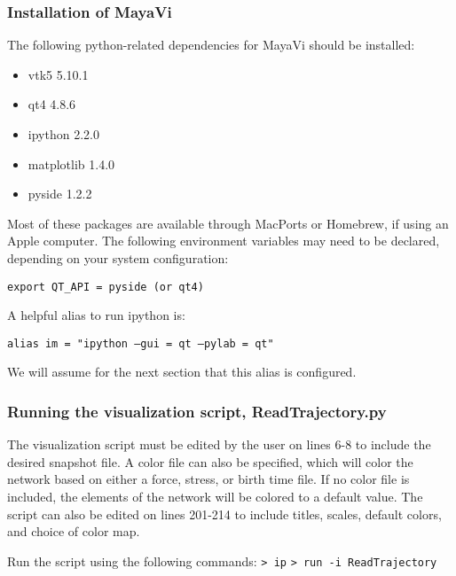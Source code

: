 \documentclass[11pt, oneside]{article}   	%
\begin{document}
\subsubsection{Installation of MayaVi}

The following python-related dependencies for MayaVi should be installed:
\begin{itemize}
\item vtk5 5.10.1
\item qt4 4.8.6
\item ipython 2.2.0
\item matplotlib 1.4.0
\item pyside 1.2.2
\end{itemize}

\noindent Most of these packages are available through MacPorts or Homebrew, if using an Apple computer. The following environment variables
may need to be declared, depending on your system configuration:\newline

\texttt{export QT\_API = pyside (or qt4)}\newline

\noindent A helpful alias to run ipython is:\newline

\texttt{alias im = "ipython --gui = qt --pylab = qt"}\newline

\noindent We will assume for the next section that this alias is configured.


\subsubsection{Running the visualization script, ReadTrajectory.py}

The visualization script must be edited by the user on lines 6-8 to include the desired snapshot file. A color file can also be specified, which will color the network based on either a force, stress, or birth time file. If no color file is included, the elements of the network will be colored to a default value. The script can also be edited on lines 201-214 to include titles, scales, default colors, and choice of color map. \newline

\noindent Run the script using the following commands:\newline\newline
\indent\texttt{> ip}\newline
\indent\texttt{> run -i ReadTrajectory}\newline
\end{document}
